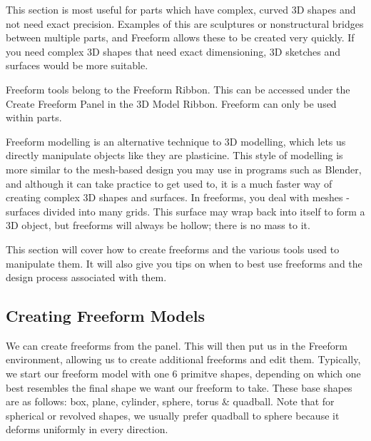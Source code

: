 
\begin{when-to-read}
This section is most useful for parts which have complex, curved 3D shapes and not need exact precision. Examples of this are sculptures or nonstructural bridges between multiple parts, and Freeform allows these to be created very quickly. If you need complex 3D shapes that need exact dimensioning, 3D sketches and surfaces would be more suitable.
\end{when-to-read}

\begin{where-to-find}
Freeform tools belong to the Freeform Ribbon. This can be accessed under the Create Freeform Panel in the 3D Model Ribbon. Freeform can only be used within parts.
\end{where-to-find}
    

Freeform modelling is an alternative technique to 3D modelling, which lets us directly manipulate objects like they are plasticine. This style of modelling is more similar to the mesh-based design you may use in programs such as Blender, and although it can take practice to get used to, it is a much faster way of creating complex 3D shapes and surfaces. In freeforms, you deal with meshes - surfaces divided into many grids. This surface may wrap back into itself to form a 3D object, but freeforms will always be hollow; there is no mass to it.

This section will cover how to create freeforms and the various tools used to manipulate them. It will also give you tips on when to best use freeforms and the design process associated with them.


\subsection{Creating Freeform Models}
\easydifficulty

We can create freeforms from the  panel. This will then put us in the Freeform environment, allowing us to create additional freeforms and edit them. Typically, we start our freeform model with one 6 primitve shapes, depending on which one best resembles the final shape we want our freeform to take. These base shapes are as follows: box, plane, cylinder, sphere, torus \& quadball. Note that for spherical or revolved shapes, we usually prefer quadball to sphere because it deforms uniformly in every direction. 

